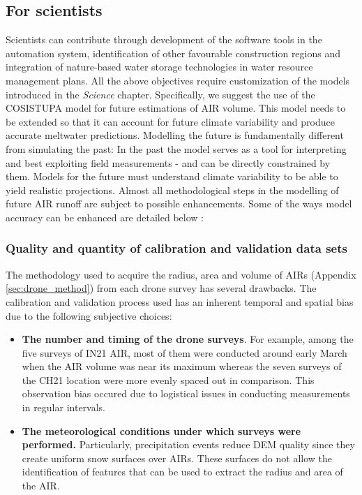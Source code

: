 \subsection{For scientists}

Scientists can contribute through development of the software tools in the automation system, identification of
other favourable construction regions and integration of nature-based water storage technologies in water
resource management plans. All the above objectives require customization of the models introduced in the
\textit{Science} chapter. Specifically, we suggest the use of the COSISTUPA model for future estimations of AIR
volume. This model needs to be extended so that it can account for future climate variability and produce
accurate meltwater predictions. Modelling the future is fundamentally different from simulating the past: In the
past the model serves as a tool for interpreting and best exploiting field measurements - and can be directly
constrained by them. Models for the future must understand climate variability to be able to yield realistic
projections. Almost all methodological steps in the modelling of future AIR runoff are subject to possible
enhancements. Some of the ways model accuracy can be enhanced are detailed below :

\subsubsection{Quality and quantity of calibration and validation data sets}

The methodology used to acquire the radius, area and volume of \ac{AIRs} (Appendix \ref{sec:drone_method}) from
each drone survey has several drawbacks. The calibration and validation process used has an inherent temporal
and spatial bias due to the following subjective choices:

\begin{itemize}
	\item \textbf{The number and timing of the drone surveys}. For example, among the five surveys of IN21 AIR, most of them were
	      conducted around early March when the AIR volume was near its maximum whereas the seven surveys of the CH21
	      location were more evenly spaced out in comparison. This observation bias occured due to logistical issues
	      in conducting measurements in regular intervals.

	\item \textbf{The meteorological conditions under which surveys were performed.} Particularly, precipitation events reduce DEM quality since
	      they create uniform snow surfaces over \ac{AIRs}. These surfaces do not allow the identification of features
	      that can be used to extract the radius and area of the AIR.

\end{itemize}

